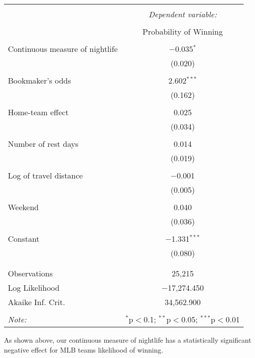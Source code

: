\documentclass[letterpaper,12pt]{article}
\begin{document}
\begin{tabular}{@{\extracolsep{5pt}}lc}  \\[-1.8ex]\hline  \hline \\[-1.8ex]   & \multicolumn{1}{c}{\textit{Dependent variable:}} \\  \cline{2-2}  \\[-1.8ex] & Probability of Winning \\  \hline \\[-1.8ex]   Continuous measure of nightlife & $-$0.035$^{*}$ \\    & (0.020) \\    & \\   Bookmaker's odds & 2.602$^{***}$ \\    & (0.162) \\    & \\   Home-team effect & 0.025 \\    & (0.034) \\    & \\   Number of rest days & 0.014 \\    & (0.019) \\    & \\   Log of travel distance & $-$0.001 \\    & (0.005) \\    & \\   Weekend & 0.040 \\    & (0.036) \\    & \\   Constant & $-$1.331$^{***}$ \\    & (0.080) \\    & \\  \hline \\[-1.8ex]  Observations & 25,215 \\  Log Likelihood & $-$17,274.450 \\  Akaike Inf. Crit. & 34,562.900 \\  \hline  \hline \\[-1.8ex]  \textit{Note:}  & \multicolumn{1}{r}{$^{*}$p$<$0.1; $^{**}$p$<$0.05; $^{***}$p$<$0.01} \\  \end{tabular} 


As shown above, our continuous measure of nightlife has a statistically significant negative effect for MLB teams likelihood of winning.
\end{document}
